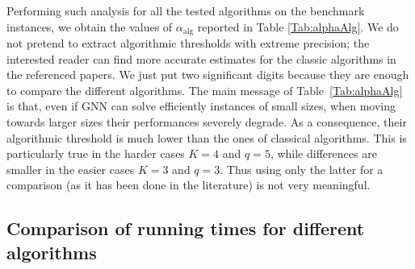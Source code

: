 \documentclass{article}
\begin{document}
Performing such analysis for all the tested algorithms on the benchmark instances, we obtain the values of $\alpha_\text{alg}$ reported in Table \ref{Tab:alphaAlg}.
We do not pretend to extract algorithmic thresholds with extreme precision; the interested reader can find more accurate estimates for the classic algorithms in the referenced papers. We just put two significant digits because they are enough to compare the different algorithms. The main message of Table~\ref{Tab:alphaAlg} is that, even if GNN can solve efficiently instances of small sizes, when moving towards larger sizes their performances severely degrade. As a consequence, their algorithmic threshold is much lower than the ones of classical algorithms. This is particularly true in the harder cases $K=4$ and $q=5$, while differences are smaller in the easier cases $K=3$ and $q=3$. Thus using only the latter for a comparison (as it has been done in the literature) is not very meaningful.


\subsection{Comparison of running times for different algorithms}
\label{sec:runningtimes}
\end{document}
